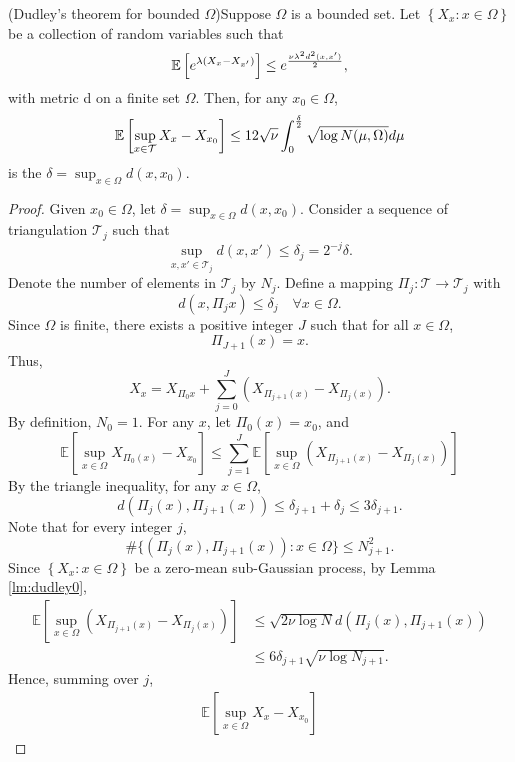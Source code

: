 \iffalse
\begin{theorem}\label{th:dudley}
(Dudley's theorem for bounded  $\Omega$)Suppose $\Omega$ is a bounded set. Let $\left\{X_x: x \in \Omega\right\}$ be a collection of random variables such that 
$$
\mathbb{E}\left[ e^{\lambda (X_x - X_{x'})}\right]\le e^{\nu\lambda^2 d^2(x, x')\over 2},
$$
with metric d on a finite set $\Omega$.
Then, for any $x_0\in \Omega$,
\begin{equation}\label{eq:dudley}
\mathbb{E}\left[\sup _{x \in \mathcal{T}} X_x-X_{x_0}\right] \leq 12\sqrt{\nu}\int_0^{\delta\over 2} \sqrt{\log N(\mu, \Omega)} d \mu
\end{equation}
is the $\displaystyle \delta=\sup_{x\in \Omega} d(x, x_0)$.
\end{theorem}
\begin{proof}
Given $x_0\in \Omega$, let $\displaystyle \delta=\sup_{x\in \Omega} d(x, x_0)$.
Consider a sequence of triangulation $\mathcal{T}_j$ such that 
$$
\sup_{x, x'\in \mathcal{T}_j}d(x, x')\le \delta_j=2^{-j}\delta.
$$
Denote the number of elements in $\mathcal{T}_j$ by $N_j$.
Define a mapping $\Pi_j: \mathcal{T}\rightarrow \mathcal{T}_j$ with
$$
d(x, \Pi_j x)\le \delta_j\quad \forall x\in \Omega.
$$
Since $\Omega$ is finite, there exists a positive integer $J$ such that for all $x\in \Omega$,
$$
\Pi_{J+1}(x)=x.
$$
Thus,
$$
X_x=X_{\Pi_0 x} + \sum_{j=0}^J (X_{\Pi_{j+1}(x)} - X_{\Pi_{j}(x)}).
$$
By definition, $N_0=1$.
For any $x$, let $\Pi_0 (x)=x_0$, and
$$
\mathbb{E}\left [ \sup_{x\in\Omega } X_{\Pi_0 (x)} - X_{x_0}\right]\leq \sum_{j=1}^J \mathbb{E}\left [ \sup_{x\in \Omega} (X_{\Pi_{j+1} (x)} - X_{\Pi_j (x)})\right]
$$
By the triangle inequality, for any $x\in \Omega$,
$$
d(\Pi_j(x), \Pi_{j+1}(x))\le \delta_{j+1} + \delta_{j}\le 3\delta_{j+1}.
$$
Note that for every integer $j$,
$$
\# \{(\Pi_j(x), \Pi_{j+1}(x)): x\in \Omega\} \le N_{j+1}^2.
$$
Since $\left\{X_x: x \in \Omega\right\}$ be a zero-mean sub-Gaussian process, by Lemma \ref{lm:dudley0},
\begin{equation}
\begin{split}
\mathbb{E}\left [ \sup_{x\in \Omega} (X_{\Pi_{j+1} (x)} - X_{\Pi_j (x)})\right]
&\le \sqrt{2 \nu \log N}d(\Pi_j(x), \Pi_{j+1}(x)) 
\\
&\le 6\delta_{j+1}\sqrt{\nu \log N_{j+1}}.
\end{split}
\end{equation}
Hence, summing over $j$,
\begin{equation}
\begin{split}
\mathbb{E}\left [ \sup_{x\in \Omega} X_x - X_{x_0}\right]

\end{split}
\end{equation}
\end{proof}
